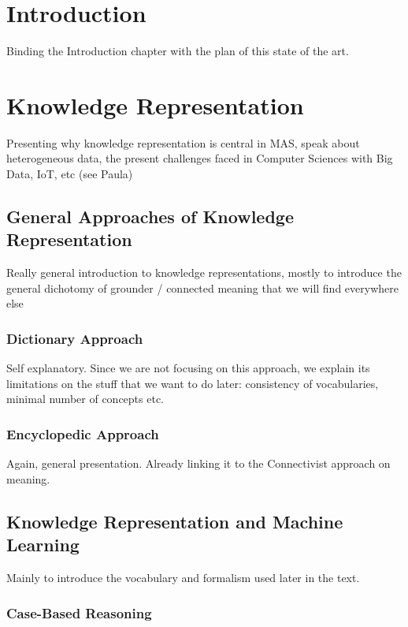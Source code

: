 
\section{Introduction}

Binding the Introduction chapter with the plan of this state of the art.

\section{Knowledge Representation}

Presenting why knowledge representation is central in MAS, speak about heterogeneous data, the present challenges faced in Computer Sciences with Big Data, IoT, etc (see Paula)

\subsection{General Approaches of Knowledge Representation}

Really general introduction to knowledge representations, mostly to introduce the general dichotomy of grounder / connected meaning that we will find everywhere else

\subsubsection{Dictionary Approach}

Self explanatory. Since we are not focusing on this approach, we explain its limitations on the stuff that we want to do later: consistency of vocabularies, minimal number of concepts etc.

\subsubsection{Encyclopedic Approach}

Again, general presentation. Already linking it to the Connectivist approach on meaning.

\subsection{Knowledge Representation and Machine Learning}

Mainly to introduce the vocabulary and formalism used later in the text.

\subsubsection{Case-Based Reasoning}

